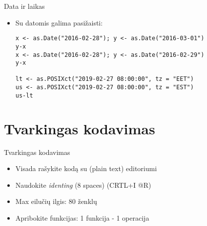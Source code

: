 \documentclass[11pt,xcolor=table]{beamer}
\begin{document}

\begin{frame}[fragile]{Data ir laikas}
\begin{itemize}
\item Su datomis galima pasižaisti:
\begin{lstlisting}
x <- as.Date("2016-02-28"); y <- as.Date("2016-03-01")
y-x
x <- as.Date("2016-02-28"); y <- as.Date("2016-02-29")
y-x

lt <- as.POSIXct("2019-02-27 08:00:00", tz = "EET")
us <- as.POSIXct("2019-02-27 08:00:00", tz = "EST")
us-lt
\end{lstlisting}
\end{itemize}
\end{frame}





\section{Tvarkingas kodavimas}

\begin{frame}{Tvarkingas kodavimas}
\begin{itemize}
\item Visada rašykite kodą su (plain text) editoriumi
\item Naudokite \textit{identing} (8 spaces) (CRTL+I @R)
\item Max eilučių ilgis: 80 ženklų
\item Apribokite funkcijas: 1 funkcija - 1 operacija
\end{itemize}
\end{frame}
\end{document}
